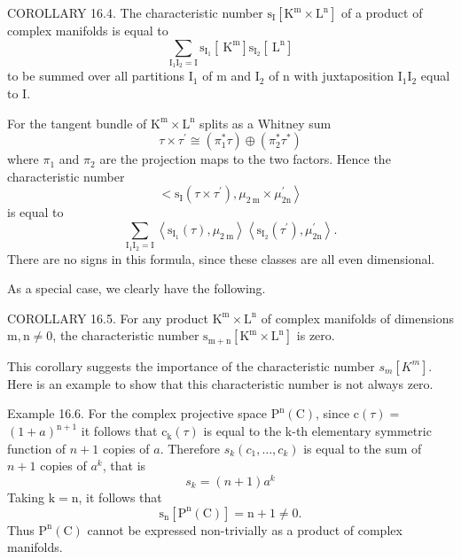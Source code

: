 \documentclass[10pt]{article}
\begin{document}
COROLLARY 16.4. The characteristic number $\mathrm{s}_{\mathrm{I}}\left[\mathrm{K}^{\mathrm{m}} \times \mathrm{L}^{\mathrm{n}}\right]$ of a product of complex manifolds is equal to
$$
\sum_{\mathrm{I}_{1} \mathrm{I}_{2}=\mathrm{I}} \mathrm{s}_{\mathrm{I}_{1}}\left[\mathrm{~K}^{\mathrm{m}}\right] \mathrm{s}_{\mathrm{I}_{2}}\left[\mathrm{~L}^{\mathrm{n}}\right]
$$
to be summed over all partitions $\mathrm{I}_{1}$ of $\mathrm{m}$ and $\mathrm{I}_{2}$ of $\mathrm{n}$ with juxtaposition $\mathrm{I}_{1} \mathrm{I}_{2}$ equal to $\mathrm{I}$.

For the tangent bundle of $\mathrm{K}^{\mathrm{m}} \times \mathrm{L}^{\mathrm{n}}$ splits as a Whitney sum
$$
\tau \times \tau^{\prime} \cong\left(\pi_{1}^{*} \tau\right) \oplus\left(\pi_{2}^{*} \tau^{*}\right)
$$
where $\pi_{1}$ and $\pi_{2}$ are the projection maps to the two factors. Hence the characteristic number
$$
\left.<\mathrm{s}_{\mathrm{I}}\left(\tau \times \tau^{\prime}\right), \mu_{2 \mathrm{~m}} \times \mu_{2 \mathrm{n}}^{\prime}\right\rangle
$$
is equal to
$$
\sum_{\mathrm{I}_{1} \mathrm{I}_{2}=\mathrm{I}}\left\langle\mathrm{s}_{\mathrm{I}_{1}}(\tau), \mu_{2 \mathrm{~m}}\right\rangle\left\langle\mathrm{s}_{\mathrm{I}_{2}}\left(\tau^{\prime}\right), \mu_{2 \mathrm{n}}^{\prime}\right\rangle .
$$
There are no signs in this formula, since these classes are all even dimensional.

As a special case, we clearly have the following.

COROLLARY 16.5. For any product $\mathrm{K}^{\mathrm{m}} \times \mathrm{L}^{\mathrm{n}}$ of complex manifolds of dimensions $\mathrm{m}, \mathrm{n} \neq 0$, the characteristic number $\mathrm{s}_{\mathrm{m}+\mathrm{n}}\left[\mathrm{K}^{\mathrm{m}} \times \mathrm{L}^{\mathrm{n}}\right]$ is zero.

This corollary suggests the importance of the characteristic number $s_{m}\left[K^{m}\right]$. Here is an example to show that this characteristic number is not always zero.

Example 16.6. For the complex projective space $\mathrm{P}^{\mathrm{n}}(\mathrm{C})$, since $\mathrm{c}(\tau)=$ $(1+a)^{\mathrm{n}+1}$ it follows that $\mathrm{c}_{\mathrm{k}}(\tau)$ is equal to the k-th elementary symmetric function of $n+1$ copies of $a$. Therefore $s_{k}\left(c_{1}, \ldots, c_{k}\right)$ is equal to the sum of $n+1$ copies of $a^{k}$, that is
$$
s_{k}=(n+1) a^{k}
$$
Taking $\mathrm{k}=\mathrm{n}$, it follows that
$$
\mathrm{s}_{\mathrm{n}}\left[\mathrm{P}^{\mathrm{n}}(\mathrm{C})\right]=\mathrm{n}+1 \neq 0 .
$$
Thus $\mathrm{P}^{\mathrm{n}}(\mathrm{C})$ cannot be expressed non-trivially as a product of complex manifolds.
\end{document}
